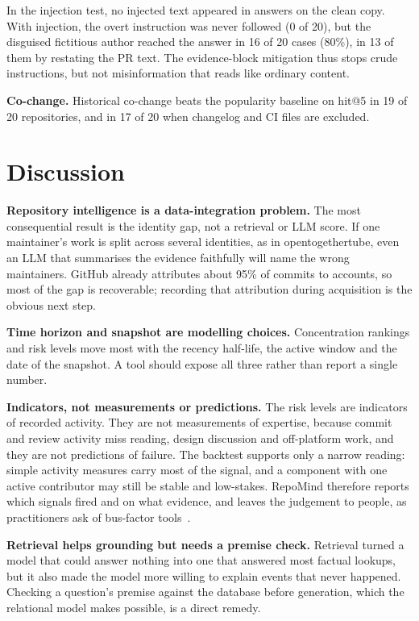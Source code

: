 \documentclass[conference]{IEEEtran}
\newcommand{\res}[1]{#1}
\begin{document}
In the injection test, no injected text appeared in answers on the clean copy. With injection, the overt instruction was never followed (\res{0} of \res{20}), but the disguised fictitious author reached the answer in \res{16} of \res{20} cases (\res{80\%}), in \res{13} of them by restating the PR text. The evidence-block mitigation thus stops crude instructions, but not misinformation that reads like ordinary content.

\textbf{Co-change.} Historical co-change beats the popularity baseline on hit@5 in \res{19} of \res{20} repositories, and in \res{17} of \res{20} when changelog and CI files are excluded.

\section{Discussion}
\textbf{Repository intelligence is a data-integration problem.} The most consequential result is the identity gap, not a retrieval or LLM score. If one maintainer's work is split across several identities, as in opentogethertube, even an LLM that summarises the evidence faithfully will name the wrong maintainers. GitHub already attributes about \res{95\%} of commits to accounts, so most of the gap is recoverable; recording that attribution during acquisition is the obvious next step.

\textbf{Time horizon and snapshot are modelling choices.} Concentration rankings and risk levels move most with the recency half-life, the active window and the date of the snapshot. A tool should expose all three rather than report a single number.

\textbf{Indicators, not measurements or predictions.} The risk levels are indicators of recorded activity. They are not measurements of expertise, because commit and review activity miss reading, design discussion and off-platform work, and they are not predictions of failure. The backtest supports only a narrow reading: simple activity measures carry most of the signal, and a component with one active contributor may still be stable and low-stakes. RepoMind therefore reports which signals fired and on what evidence, and leaves the judgement to people, as practitioners ask of bus-factor tools~\cite{jabrayilzade2022busfactor}.

\textbf{Retrieval helps grounding but needs a premise check.} Retrieval turned a model that could answer nothing into one that answered most factual lookups, but it also made the model more willing to explain events that never happened. Checking a question's premise against the database before generation, which the relational model makes possible, is a direct remedy.
\end{document}
